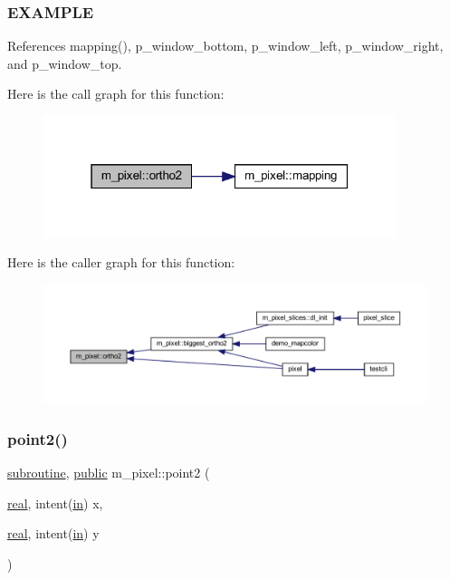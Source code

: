 \subsubsection*{E\+X\+A\+M\+P\+LE}

References mapping(), p\+\_\+window\+\_\+bottom, p\+\_\+window\+\_\+left, p\+\_\+window\+\_\+right, and p\+\_\+window\+\_\+top.

Here is the call graph for this function\+:
\nopagebreak
\begin{figure}[H]
\begin{center}
\leavevmode
\includegraphics[width=292pt]{namespacem__pixel_a80dece6adac704024a5a76efee697770_cgraph}
\end{center}
\end{figure}
Here is the caller graph for this function\+:
\nopagebreak
\begin{figure}[H]
\begin{center}
\leavevmode
\includegraphics[width=350pt]{namespacem__pixel_a80dece6adac704024a5a76efee697770_icgraph}
\end{center}
\end{figure}
\mbox{\label{namespacem__pixel_a11234e0b33104eb0afb24f928b072053}} 
\subsubsection{\texorpdfstring{point2()}{point2()}}
{\footnotesize\ttfamily \hyperlink{M__stopwatch_83_8txt_acfbcff50169d691ff02d4a123ed70482}{subroutine}, \hyperlink{M__stopwatch_83_8txt_a2f74811300c361e53b430611a7d1769f}{public} m\+\_\+pixel\+::point2 (\begin{DoxyParamCaption}\item[{\hyperlink{read__watch_83_8txt_abdb62bde002f38ef75f810d3a905a823}{real}, intent(\hyperlink{M__journal_83_8txt_afce72651d1eed785a2132bee863b2f38}{in})}]{x,  }\item[{\hyperlink{read__watch_83_8txt_abdb62bde002f38ef75f810d3a905a823}{real}, intent(\hyperlink{M__journal_83_8txt_afce72651d1eed785a2132bee863b2f38}{in})}]{y }\end{DoxyParamCaption})}



